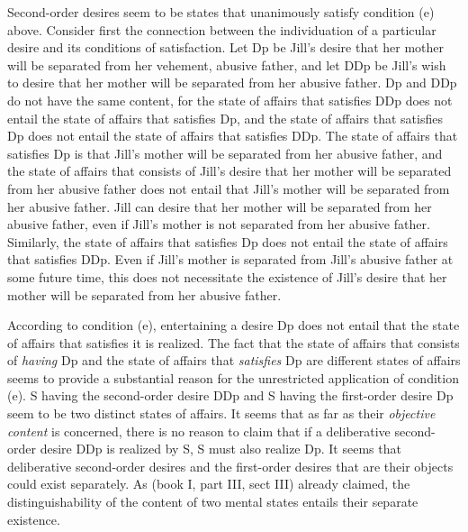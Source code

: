 \documentclass[output=paper,colorlinks,citecolor=brown
]{langscibook}
\begin{document}
Second-order desires seem to be states that unanimously satisfy condition (e) above. Consider first the connection between the individuation of a particular desire and its conditions of satisfaction. Let Dp be Jill’s desire that her mother will be separated from her vehement, abusive father, and let DDp be Jill’s wish to desire that her mother will be separated from her abusive father. Dp and DDp do not have the same content, for the state of affairs that satisfies DDp does not entail the state of affairs that satisfies Dp, and the state of affairs that satisfies Dp does not entail the state of affairs that satisfies DDp. The state of affairs that satisfies Dp is that Jill’s mother will be separated from her abusive father, and the state of affairs that consists of Jill's desire that her mother will be separated from her abusive father does not entail that Jill’s mother will be separated from her abusive father. Jill can desire that her mother will be separated from her abusive father, even if Jill’s mother is not separated from her abusive father. Similarly, the state of affairs that satisfies Dp does not entail the state of affairs that satisfies DDp. Even if Jill’s mother is separated from Jill’s abusive father at some future time, this does not necessitate the existence of Jill's desire that her mother will be separated from her abusive father.

According to condition (e), entertaining a desire Dp does not entail that the state of affairs that satisfies it is realized. The fact that the state of affairs that consists of \textit{having} Dp and the state of affairs that \textit{satisfies} Dp are different states of affairs seems to provide a substantial reason for the unrestricted application of condition (e). S having the second-order desire DDp and S having the first-order desire Dp seem to be two distinct states of affairs. It seems that as far as their \textit{objective content} is concerned, there is no reason to claim that if a deliberative second-order desire DDp is realized by S, S must also realize Dp. It seems that deliberative second-order desires and the first-order desires that are their objects could exist separately. As \citet{hume2000treatise} (book I, part III, sect III) already claimed, the distinguishability of the content of two mental states entails their separate existence.
\end{document}
